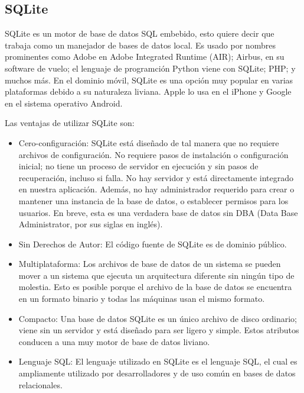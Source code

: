 \subsection{SQLite}
	\par 
		SQLite es un motor de base de datos SQL embebido, esto quiere decir que trabaja como un manejador de bases de datos local. Es usado por nombres prominentes como
		Adobe en Adobe Integrated Runtime (AIR); Airbus, en su software de vuelo; el lenguaje de programción Python viene 
		con SQLite; PHP; y muchos más. En el dominio móvil, SQLite es una opción muy popular
		en varias plataformas debido a su naturaleza liviana. Apple lo usa en el iPhone y
		Google en el sistema operativo Android.
	
	\par \noindent	
		Las ventajas de utilizar SQLite son:
		
		\begin{itemize}
			\item Cero-configuración: SQLite está diseñado de tal manera que no requiere
			archivos de configuración. No requiere pasos de instalación o configuración inicial; no tiene un
			proceso de servidor en ejecución y sin pasos de recuperación, incluso si falla. No hay servidor
			y está directamente integrado en nuestra aplicación. Además, no hay administrador
			requerido para crear o mantener una instancia de la base de datos, o establecer permisos para los usuarios. En breve,
			esta es una verdadera base de datos sin DBA (Data Base Administrator, por sus siglas en inglés).
			
			\item Sin Derechos de Autor: El código fuente
			de SQLite es de dominio público.
			
			\item Multiplataforma: Los archivos de base de datos de un sistema se pueden mover a un sistema que ejecuta un
			arquitectura diferente sin ningún tipo de molestia. Esto es posible porque el archivo de la base de datos se encuentra en un formato binario y todas las máquinas usan el mismo formato.
			
			\item Compacto: Una base de datos SQLite es un único archivo de disco ordinario; viene sin un
			servidor y está diseñado para ser ligero y simple. Estos atributos conducen a una muy
			motor de base de datos liviano.
			
			\item Lenguaje SQL: El lenguaje utilizado en SQLite es el lenguaje SQL, el cual es ampliamente utilizado por desarrolladores y de uso común en bases de datos relacionales.
			
		\end{itemize}
		
		